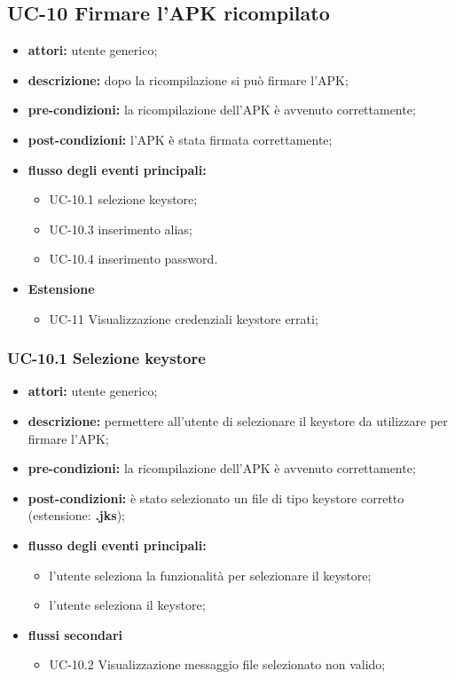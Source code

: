 \subsection*{UC-10 Firmare l'APK ricompilato}\label{subsec:uc-10-firmare-l'apk-ricompilato}
\begin{itemize}
    \item \textbf{attori:} utente generico;
    \item \textbf{descrizione:} dopo la ricompilazione si può firmare l'APK;
    \item \textbf{pre-condizioni:} la ricompilazione dell'APK è avvenuto correttamente;
    \item \textbf{post-condizioni:} l'APK è stata firmata correttamente;
    \item \textbf{flusso degli eventi principali:}
    \begin{itemize}
        \item UC-10.1 selezione keystore;
        \item UC-10.3 inserimento alias;
        \item UC-10.4 inserimento password.
    \end{itemize}
    \item \textbf{Estensione}
    \begin{itemize}
        \item UC-11 Visualizzazione credenziali keystore errati;
    \end{itemize}
\end{itemize}
\subsubsection*{UC-10.1 Selezione keystore}\label{subsubsec:uc-10.1-selezione-keystore}
\begin{itemize}
    \item \textbf{attori:} utente generico;
    \item \textbf{descrizione:} permettere all'utente di selezionare il keystore da utilizzare per firmare l'APK;
    \item \textbf{pre-condizioni:} la ricompilazione dell'APK è avvenuto correttamente;
    \item \textbf{post-condizioni:} è stato selezionato un file di tipo keystore corretto (estensione: \textbf{.jks});
    \item \textbf{flusso degli eventi principali:}
    \begin{itemize}
        \item l'utente seleziona la funzionalità per selezionare il keystore;
        \item l'utente seleziona il keystore;
    \end{itemize}
    \item \textbf{flussi secondari}
    \begin{itemize}
        \item UC-10.2 Visualizzazione messaggio file selezionato non valido;
    \end{itemize}
\end{itemize}
